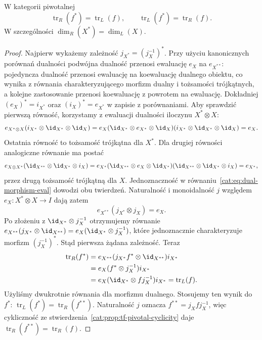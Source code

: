 \begin{stwierdzenie}\label{cat:prop:tf-dual-traces}
W kategorii piwotalnej
\[
 \operatorname{tr}_R(f^*)=\operatorname{tr}_L(f),
 \qquad
 \operatorname{tr}_L(f^*)=\operatorname{tr}_R(f).
\]
W szczególności $\dim_R(X^*)=\dim_L(X)$.
\end{stwierdzenie}
\begin{proof}
Najpierw wykażemy zależność $j_{X^*}=(j_X^{-1})^*$. Przy użyciu kanonicznych porównań dualności podwójna dualność przenosi ewaluację $e_X$ na $e_{X^{**}}$: pojedyncza dualność przenosi ewaluację na koewaluację dualnego obiektu, co wynika z równania charakteryzującego morfizm dualny i tożsamości trójkątnych, a kolejne zastosowanie przenosi koewaluację z powrotem na ewaluację. Dokładniej $(e_X)^*=i_{X^*}$ oraz $(i_X)^*=e_{X^*}$ w zapisie z porównaniami. Aby sprawdzić pierwszą równość, korzystamy z ewaluacji dualności iloczynu $X^*\otimes X$:
\[
 e_{X^*\otimes X}(i_{X^*}\otimes\id_{X^*}\otimes\id_X)
 =e_X(\id_{X^*}\otimes e_{X^*}\otimes\id_X)
 (i_{X^*}\otimes\id_{X^*}\otimes\id_X)=e_X.
\]
Ostatnia równość to tożsamość trójkątna dla $X^*$. Dla drugiej równości analogiczne równanie ma postać
\[
 e_{X\otimes X^*}(\id_{X^{**}}\otimes\id_{X^*}\otimes i_X)
 =e_{X^*}(\id_{X^{**}}\otimes e_X\otimes\id_{X^*})
 (\id_{X^{**}}\otimes\id_{X^*}\otimes i_X)=e_{X^*},
\]
przez drugą tożsamość trójkątną dla $X$. Jednoznaczność w równaniu~\eqref{cat:eq:dual-morphism-eval} dowodzi obu twierdzeń. Naturalność i monoidalność $j$ względem $e_X:X^*\otimes X\to I$ dają zatem
\[
 e_{X^{**}}(j_{X^*}\otimes j_X)=e_X.
\]
Po złożeniu z $\id_{X^*}\otimes j_X^{-1}$ otrzymujemy równanie
$e_{X^{**}}(j_{X^*}\otimes\id_{X^{**}})=e_X(\id_{X^*}\otimes j_X^{-1})$,
które jednoznacznie charakteryzuje morfizm $(j_X^{-1})^*$. Stąd pierwsza żądana zależność. Teraz
\[
\begin{aligned}
 \operatorname{tr}_R(f^*)
 &= e_{X^{**}}(j_{X^*}f^*\otimes\id_{X^{**}})i_{X^*}\\
 &= e_X(f^*\otimes j_X^{-1})i_{X^*}\\
 &= e_X(\id_{X^*}\otimes f j_X^{-1})i_{X^*}
 =\operatorname{tr}_L(f).
\end{aligned}
\]
Użyliśmy dwukrotnie równania dla morfizmu dualnego. Stosujemy ten wynik do $f^*$: $\operatorname{tr}_L(f^*)=\operatorname{tr}_R(f^{**})$. Naturalność $j$ oznacza $f^{**}=j_X f j_X^{-1}$, więc cykliczność ze stwierdzenia~\ref{cat:prop:tf-pivotal-cyclicity} daje $\operatorname{tr}_R(f^{**})=\operatorname{tr}_R(f)$.
\end{proof}

